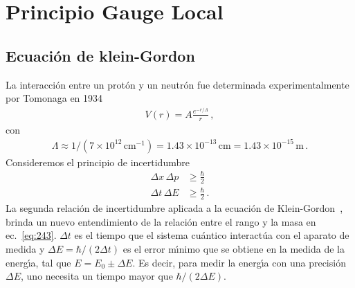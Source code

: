 \chapter{Principio Gauge Local}
\label{cha:princ-gauge-local} %
\section{Ecuaci\'on de klein-Gordon}
\label{sec:ecuacion-de-klein}
La interacci\'on entre un prot\'on y un neutr\'on fue determinada experimentalmente por Tomonaga en 1934 \cite{history}
\begin{align}
\label{eq:243}
  V(r)={A}\frac{e^{-r/\Lambda }}{r}\,,
\end{align}
con
\begin{align}
  \label{eq:245}
  \Lambda\approx1/(7\times10^{12}\,\text{cm}^{-1})=1.43\times10^{-13}\,\text{cm}=1.43\times10^{-15}\,\text{m}\,.
\end{align}
Consideremos el principio de incertidumbre
\begin{align}
  \Delta x\, \Delta p &\geq \frac{\hbar}{2}\nonumber\\
\Delta t\, \Delta E&\geq\frac{\hbar}{2}\,.
\end{align}
La segunda relaci\'on de incertidumbre
aplicada a la ecuación de Klein-Gordon~\cite{Aitchison:2003tq}, brinda un nuevo entendimiento de la relaci\'on entre el rango y la masa en ec.~\eqref{eq:243}. $\Delta t$ es el tiempo que el sistema cu\'antico interact\'ua con el aparato de medida y $\Delta E=\hbar/(2\Delta t)$ es el error m\'\i nimo que se obtiene en la medida de la energ\'\i a, tal que $E=E_0\pm\Delta E$. Es decir, para medir la energ\'\i a con una precisi\'on $\Delta E$, uno necesita un tiempo mayor que $\hbar/(2\Delta E)$.

